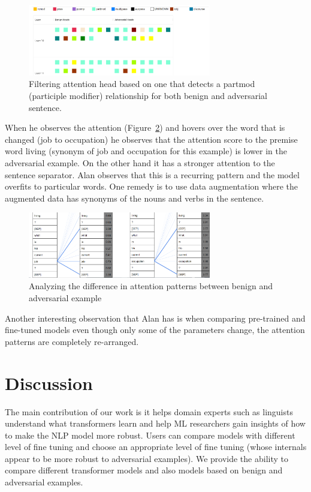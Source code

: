 \documentclass[journal]{vgtc}                %
\begin{document}
\begin{figure}[h]
    \centering
    
    \includegraphics[width=8cm]{figures/partmod.png}
    \caption{Filtering attention head based on one that detects a partmod (participle modifier) relationship for both benign and adversarial sentence.}
    \label{fig:partmod}
    
\end{figure}

When he observes the attention (Figure~\ref{fig:usecase}) and hovers over the word that is changed (job to occupation) he observes that the attention score to the premise word living (synonym of job and occupation for this example) is lower in the adversarial example. On the other hand it has a stronger attention to the sentence separator. Alan observes that this is a recurring pattern and the model overfits to particular words. One remedy is to use data augmentation where the augmented data has synonyms of the nouns and verbs in the sentence.


\begin{figure}[h]
    \centering
    
    \includegraphics[width=8cm]{figures/usecase.png}
    \caption{Analyzing the difference in attention patterns between benign and adversarial example}
    \label{fig:usecase}
    
\end{figure}


Another interesting observation that Alan has is when comparing pre-trained and fine-tuned models even though only some of the parameters change, the attention patterns are completely re-arranged.

\section{Discussion}
The main contribution of our work is it helps domain experts such as linguists understand what transformers learn and help ML researchers gain insights of how to make the NLP model more robust. Users can compare models with different level of fine tuning and choose an appropriate level of fine tuning (whose internals appear to be more robust to adversarial examples). We provide the ability to compare different transformer models and also models based on benign and adversarial examples.
\end{document}
